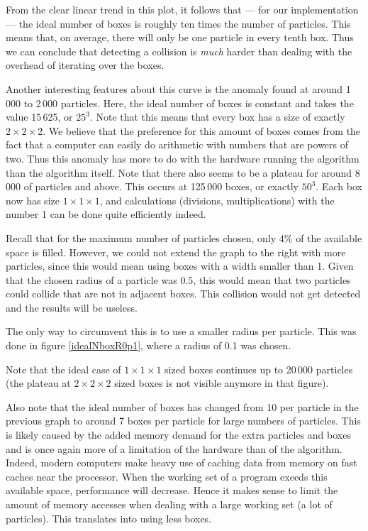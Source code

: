 From the clear linear trend in this plot, it follows that --- for our 
implementation  --- the ideal number of boxes is roughly ten times the 
number of particles. This means that, on average, there will only be one 
particle in every tenth box. Thus we can conclude that detecting a 
collision is \emph{much} harder than dealing with the overhead of iterating 
over the boxes.

Another interesting features about this curve is the anomaly found at 
around 1\,000 to 2\,000 particles. Here, the ideal number of boxes is 
constant and takes the value 15\,625, or $25^3$. Note that this means that 
every box has a size of exactly $2 \times 2 \times 2$. We believe that the 
preference for this amount of boxes comes from the fact that a computer can 
easily do arithmetic with numbers that are powers of two. Thus this anomaly 
has more to do with the hardware running the algorithm than the algorithm 
itself. Note that there also seems to be a plateau for around 8\,000 of 
particles and above. This occurs at 125\,000 boxes, or exactly $50^3$. Each 
box now has size $1 \times 1 \times 1$, and calculations (divisions, 
multiplications) with the number 1 can be done quite efficiently indeed.

Recall that for the maximum number of particles chosen, only 4\% of the 
available space is filled. However, we could not extend the graph to the 
right with more particles, since this would mean using boxes with a width 
smaller than 1. Given that the chosen radius of a particle was $0.5$, this 
would mean that two particles could collide that are not in adjacent boxes.  
This collision would not get detected and the results will be useless.

The only way to circumvent this is to use a smaller radius per particle.  
This was done in figure \ref{idealNboxR0p1}, where a radius of 0.1 was 
chosen.



Note that the ideal case of $1 \times 1 \times 1$ sized boxes continues up 
to 20\,000 particles (the plateau at $2 \times 2 \times 2$ sized boxes is 
not visible anymore in that figure).

Also note that the ideal number of boxes has changed from 10 per particle 
in the previous graph to around 7 boxes per particle for large numbers of 
particles. This is likely caused by the added memory demand for the extra 
particles and boxes and is once again more of a limitation of the hardware 
than of the algorithm. Indeed, modern computers make heavy use of caching 
data from memory on fast caches near the processor. When the working set of 
a program exeeds this available space, performance will decrease. Hence it 
makes sense to limit the amount of memory accesses when dealing with a 
large working set (a lot of particles). This translates into using less 
boxes.

